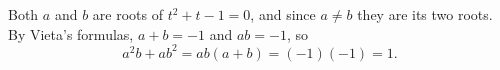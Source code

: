 Both $a$ and $b$ are roots of $t^2+t-1=0$, and since $a\ne b$ they are its two roots. By Vieta's formulas, $a+b=-1$ and $ab=-1$, so
\[
a^2b+ab^2=ab(a+b)=(-1)(-1)=\boxed{1}.
\]
